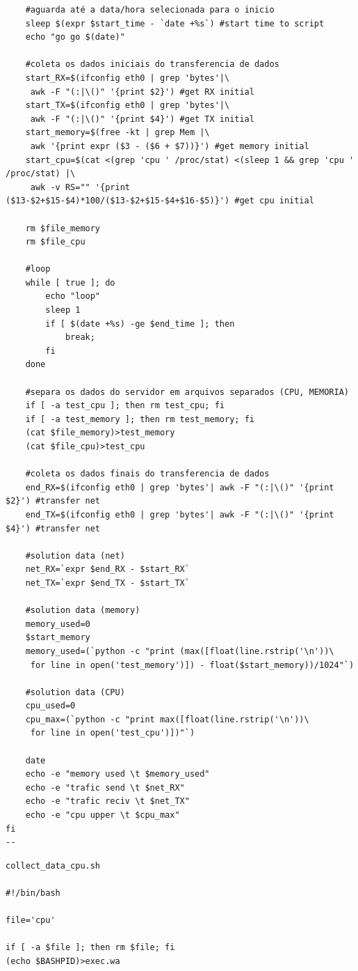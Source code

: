 \documentclass[
	12pt,				%
	openright,			%
	twoside,			%
	a4paper,			%
	chapter=TITLE,		%
	english,			%
	brazil				%
	]{abntex2}
\begin{document}
\begin{apendicesenv}
\begin{verbatim}
	#aguarda até a data/hora selecionada para o inicio
	sleep $(expr $start_time - `date +%s`) #start time to script
	echo "go go $(date)"

	#coleta os dados iniciais do transferencia de dados
	start_RX=$(ifconfig eth0 | grep 'bytes'|\
	 awk -F "(:|\()" '{print $2}') #get RX initial
	start_TX=$(ifconfig eth0 | grep 'bytes'|\
	 awk -F "(:|\()" '{print $4}') #get TX initial
	start_memory=$(free -kt | grep Mem |\
	 awk '{print expr ($3 - ($6 + $7))}') #get memory initial
	start_cpu=$(cat <(grep 'cpu ' /proc/stat) <(sleep 1 && grep 'cpu ' /proc/stat) |\
	 awk -v RS="" '{print ($13-$2+$15-$4)*100/($13-$2+$15-$4+$16-$5)}') #get cpu initial

	rm $file_memory
	rm $file_cpu
	
	#loop
	while [ true ]; do
		echo "loop"
		sleep 1
		if [ $(date +%s) -ge $end_time ]; then
			break;
		fi
	done
	
	#separa os dados do servidor em arquivos separados (CPU, MEMORIA)
	if [ -a test_cpu ]; then rm test_cpu; fi
	if [ -a test_memory ]; then rm test_memory; fi
	(cat $file_memory)>test_memory
	(cat $file_cpu)>test_cpu
	
	#coleta os dados finais do transferencia de dados
	end_RX=$(ifconfig eth0 | grep 'bytes'| awk -F "(:|\()" '{print $2}') #transfer net
	end_TX=$(ifconfig eth0 | grep 'bytes'| awk -F "(:|\()" '{print $4}') #transfer net

	#solution data (net)
	net_RX=`expr $end_RX - $start_RX`
	net_TX=`expr $end_TX - $start_TX`

	#solution data (memory)
	memory_used=0
	$start_memory
	memory_used=(`python -c "print (max([float(line.rstrip('\n'))\
	 for line in open('test_memory')]) - float($start_memory))/1024"`)

	#solution data (CPU)
	cpu_used=0
	cpu_max=(`python -c "print max([float(line.rstrip('\n'))\
	 for line in open('test_cpu')])"`)

	date
	echo -e "memory used \t $memory_used"
	echo -e "trafic send \t $net_RX" 
	echo -e "trafic reciv \t $net_TX" 
	echo -e "cpu upper \t $cpu_max"
fi
--
\end{verbatim}



\begin{verbatim}
collect_data_cpu.sh

#!/bin/bash

file='cpu'

if [ -a $file ]; then rm $file; fi
(echo $BASHPID)>exec.wa


\end{verbatim}
\end{apendicesenv}
\end{document}
